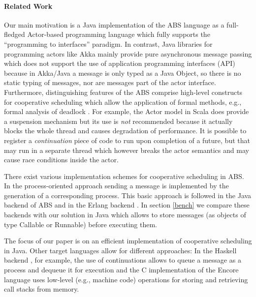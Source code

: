 \paragraph{Related Work}

Our main motivation is  a Java  implementation of the ABS language  as a full-fledged Actor-based programming language which fully supports   the ``programming to interfaces'' paradigm.
In contrast,  Java libraries for programming actors like Akka  \cite{Akka} mainly  provide  pure asynchronous  message passing which does not  support the use of application programming interfaces (API)  because in Akka/Java a message is only typed as a Java Object, so there is no static typing of messages, nor are messages part of the actor interface.
Furthermore,  distinguishing features of the ABS comprise  high-level constructs for cooperative scheduling which allow the application of formal methods, e.g.,
formal analysis of deadlock \cite{deadlock}.
For example,   the Actor model in Scala \cite{Scala} does provide a  suspension mechanism but its use is \emph{not} recommended because it actually blocks the whole thread and causes
degradation of  performance.
It is possible to register a {\em continuation} piece of code to run upon completion of a future, but that may run in a separate thread which however breaks the actor semantics and may cause race conditions inside the actor.

There exist various implementation schemes for cooperative scheduling in ABS.
In the process-oriented approach sending a message  is implemented by the generation of a  corresponding process. This basic approach is followed in the Java backend of ABS \cite{abs,Schafer} and in the Erlang backend \cite{Erlang}.
In section \ref{bench} we compare these backends with our solution in Java which allows to store messages (as objects of type Callable or Runnable) before executing them.

The focus of our paper is  on an efficient implementation of cooperative scheduling in Java.
Other target languages allow for different approaches:
In the Haskell backend \cite{Haskell}, for example,   the use of continuations allows
to queue  a message as a process and dequeue it for execution and the C implementation of the
Encore language \cite{Encore}  uses low-level (e.g., machine code) operations for
storing and retrieving call stacks from memory.






